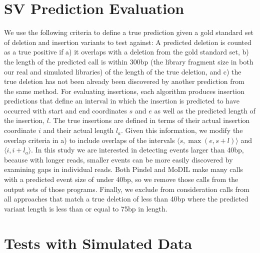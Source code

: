 \section{SV Prediction Evaluation}

We use the following criteria to define a true prediction given a gold standard set of deletion and insertion variants to test against: A predicted deletion is counted as a true positive if a) it overlaps with a deletion from the gold standard set, b) the length of the predicted call is within 300bp (the library fragment size in both our real and simulated libraries) of the length of the true deletion, and c) the true deletion has not been already been discovered by another prediction from the same method. For evaluating insertions, each algorithm produces insertion predictions that define an interval in which the insertion is predicted to have occurred with start and end coordinates $s$ and $e$ as well as the predicted length of the insertion, $l$. The true insertions are defined in terms of their actual insertion coordinate $i$ and their actual length $l_a$. Given this information, we modify the overlap criteria in a) to include overlaps of the intervals $\langle s,\max{\left(e,s+l\right)} \rangle$ and $\langle i,i+l_a \rangle$. In this study we are interested in detecting events larger than 40bp, because with longer reads, smaller events can be more easily discovered by examining gaps in individual reads. Both Pindel and MoDIL make many calls with a predicted event size of under 40bp, so we remove those calls from the output sets of those programs. Finally, we exclude from consideration calls from all approaches that match a true deletion of less than 40bp where the predicted variant length is less than or equal to 75bp in length.


\section{Tests with Simulated Data}

